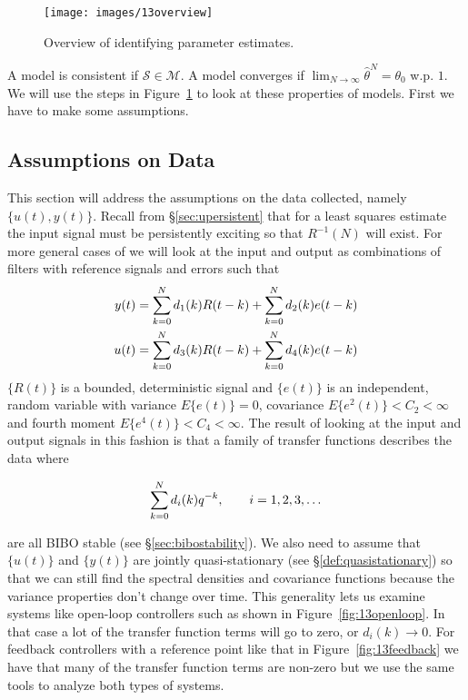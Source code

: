 \begin{figure}[ht!]
\centering
\texttt{[image: images/13overview]}
\caption{Overview of identifying parameter estimates.}%
\label{fig:13overview}
\end{figure}

A model is consistent if $\mathcal{S}\in\mathcal{M}$.
A model converges if $\lim_{N\to\infty}\hat{\theta}^N = \theta_0$ w.p. $1$.
We will use the steps in Figure~\ref{fig:13overview} to look at these properties of models.
First we have to make some assumptions.

\subsection{Assumptions on Data}%
\label{sec:14data}
This section will address the assumptions on the data collected, namely $\{u(t),y(t)\}$.
Recall from \S\ref{sec:upersistent} that for a least squares estimate the input signal must be persistently exciting so that $R^{-1}(N)$ will exist.
For more general cases of we will look at the input and output as combinations of filters with reference signals and errors such that
\begin{align*}
y(t) &= \sum_{k=0}^N d_1(k)R(t-k) + \sum_{k=0}^N d_2(k)e(t-k) \\
u(t) &= \sum_{k=0}^N d_3(k)R(t-k) + \sum_{k=0}^N d_4(k)e(t-k)
\end{align*}
$\{R(t)\}$ is a bounded, deterministic signal and $\{e(t)\}$ is an independent, random variable with variance $E\{e(t)\} = 0$, covariance $E\{e^2(t)\}<C_2<\infty$ and fourth moment $E\{e^4(t)\}<C_4<\infty$.
The result of looking at the input and output signals in this fashion is that a family of transfer functions describes the data where

\begin{equation*}
\sum_{k=0}^N d_i(k)q^{-k}, \qquad i=1,2,3,\ldots
\end{equation*}

are all BIBO stable (see \S\ref{sec:bibostability}).
We also need to assume that $\{u(t)\}$ and $\{y(t)\}$ are jointly quasi-stationary (see \S\ref{def:quasistationary}) so that we can still find the spectral densities and covariance functions because the variance properties don't change over time.
This generality lets us examine systems like open-loop controllers such as shown in Figure~\ref{fig:13openloop}.
In that case a lot of the transfer function terms will go to zero, or $d_i(k)\to0$.
For feedback controllers with a reference point like that in Figure~\ref{fig:13feedback} we have that many of the transfer function terms are non-zero but we use the same tools to analyze both types of systems.

